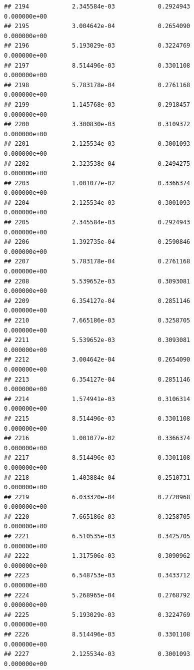 \documentclass[
]{article}
\begin{document}
\begin{verbatim}
## 2194            2.345584e-03            0.2924943            0.000000e+00
## 2195            3.004642e-04            0.2654090            0.000000e+00
## 2196            5.193029e-03            0.3224769            0.000000e+00
## 2197            8.514496e-03            0.3301108            0.000000e+00
## 2198            5.783178e-04            0.2761168            0.000000e+00
## 2199            1.145768e-03            0.2918457            0.000000e+00
## 2200            3.300830e-03            0.3109372            0.000000e+00
## 2201            2.125534e-03            0.3001093            0.000000e+00
## 2202            2.323538e-04            0.2494275            0.000000e+00
## 2203            1.001077e-02            0.3366374            0.000000e+00
## 2204            2.125534e-03            0.3001093            0.000000e+00
## 2205            2.345584e-03            0.2924943            0.000000e+00
## 2206            1.392735e-04            0.2590846            0.000000e+00
## 2207            5.783178e-04            0.2761168            0.000000e+00
## 2208            5.539652e-03            0.3093081            0.000000e+00
## 2209            6.354127e-04            0.2851146            0.000000e+00
## 2210            7.665186e-03            0.3258705            0.000000e+00
## 2211            5.539652e-03            0.3093081            0.000000e+00
## 2212            3.004642e-04            0.2654090            0.000000e+00
## 2213            6.354127e-04            0.2851146            0.000000e+00
## 2214            1.574941e-03            0.3106314            0.000000e+00
## 2215            8.514496e-03            0.3301108            0.000000e+00
## 2216            1.001077e-02            0.3366374            0.000000e+00
## 2217            8.514496e-03            0.3301108            0.000000e+00
## 2218            1.403884e-04            0.2510731            0.000000e+00
## 2219            6.033320e-04            0.2720968            0.000000e+00
## 2220            7.665186e-03            0.3258705            0.000000e+00
## 2221            6.510535e-03            0.3425705            0.000000e+00
## 2222            1.317506e-03            0.3090962            0.000000e+00
## 2223            6.548753e-03            0.3433712            0.000000e+00
## 2224            5.268965e-04            0.2768792            0.000000e+00
## 2225            5.193029e-03            0.3224769            0.000000e+00
## 2226            8.514496e-03            0.3301108            0.000000e+00
## 2227            2.125534e-03            0.3001093            0.000000e+00

\end{verbatim}
\end{document}

